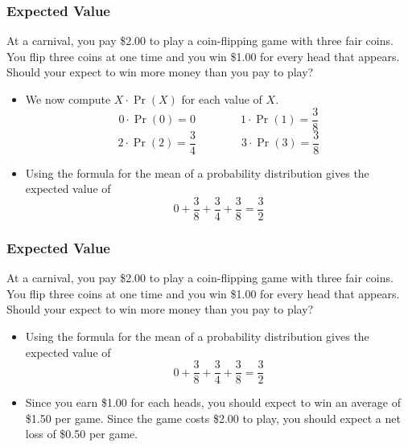 \documentclass{beamer}
\theoremstyle{definition}
\begin{document}
\begin{frame}
\frametitle{Expected Value}
\vspace*{-.15in}
\begin{example}
At a carnival, you pay \$2.00 to play a coin-flipping game with three fair coins.  You flip three coins at one time and you win \$1.00 for every head that appears.  Should your expect to win more money than you pay to play?
\end{example}
\begin{itemize}
\item We now compute $X\cdot\Pr(X)$ for each value of $X$.
$$0\cdot\Pr(0)=0\qquad\qquad 1\cdot\Pr(1)=\frac{3}{8}$$
$$2\cdot\Pr(2)=\frac{3}{4}\qquad\qquad 3\cdot\Pr(3)=\frac{3}{8}$$\pause
\item Using the formula for the mean of a probability distribution gives the expected value of 
$$0+\frac{3}{8}+\frac{3}{4}+\frac{3}{8}=\frac{3}{2}$$
\end{itemize}
\end{frame}

\begin{frame}
\frametitle{Expected Value}
\vspace*{-.15in}
\begin{example}
At a carnival, you pay \$2.00 to play a coin-flipping game with three fair coins.  You flip three coins at one time and you win \$1.00 for every head that appears.  Should your expect to win more money than you pay to play?
\end{example}
\begin{itemize}
\item Using the formula for the mean of a probability distribution gives the expected value of 
$$0+\frac{3}{8}+\frac{3}{4}+\frac{3}{8}=\frac{3}{2}$$\pause
\item Since you earn \$1.00 for each heads, you should expect to win an average of \$1.50 per game.  Since the game costs \$2.00 to play, you should expect a net loss of \$0.50 per game.
\end{itemize}
\end{frame}
\end{document}
